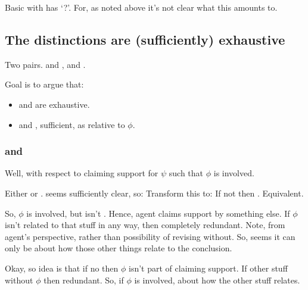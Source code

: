 \begin{note}
  Basic \AR{} with \adB{} has `?'.
  For, as noted above it's not clear what this amounts to.
\end{note}

\subsection{The distinctions are (sufficiently) exhaustive}
\label{sec:ar-wr-are}

\begin{note}
  Two pairs.
  \AR{} and \WR{}, \adA{} and \adB{}.

  Goal is to argue that:
  \begin{itemize}
  \item \AR{} and \WR{} are exhaustive.
  \item \adA{} and \adB{}, sufficient, as relative to \(\phi\).
  \end{itemize}
\end{note}



\subsubsection{\adA{} and \adB{}}

\begin{note}
  Well, with respect to claiming support for \(\psi\) such that \(\phi\) is involved.

  Either \adA{} or \adB{}.
  \adA{} seems sufficiently clear, so:
  Transform this to: If not \adA{} then \adB{}.
  Equivalent.
\end{note}

\begin{note}[Idea]
  So, \(\phi\) is involved, but isn't \adA{}.
  Hence, agent claims support by something else.
  If \(\phi\) isn't related to that stuff in any way, then completely redundant.
  Note, from agent's perspective, rather than possibility of revising without.
  So, seems it can only be about how those other things relate to the conclusion.

  Okay, so idea is that if no \adA{} then \(\phi\) isn't part of claiming support.
  If other stuff without \(\phi\) then redundant.
  So, if \(\phi\) is involved, about how the other stuff relates.
\end{note}

